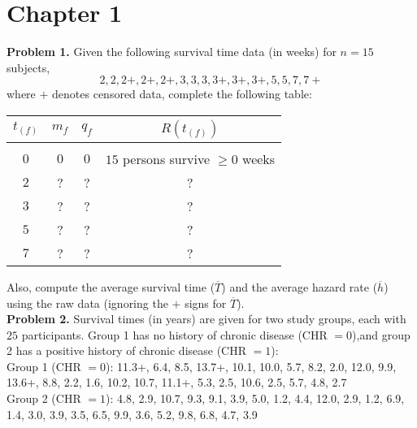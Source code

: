\documentclass[12pt]{article}
\begin{document}
\section{Chapter 1}



\textbf{Problem 1.}
Given the following survival time data (in weeks) for $n = 15$ subjects,
$$
2, 2, 2+, 2+, 2+, 3, 3, 3, 3+, 3+, 3+, 5, 5, 7, 7+
$$ where $+$ denotes censored data, complete the following table:

\begin{center}
\begin{tabular}{ c c c c }
 $t_{(f)}$ & $m_{f}$ & $q_{f}$ & $R(t_{(f)})$ \\
 \hline \\ 
 $0$ & $0$ & $0$ & $15$ persons survive $\geq 0$ weeks \\  
 $2$ &?  &?  &? \\
 $3$ &?  &?  &? \\    
 $5$ &?  &?  &? \\
 $7$ &?  &?  &?   
\end{tabular}
\end{center}

Also, compute the average survival time ($\overline{T}$) and the average hazard rate ($\overline{h}$) using the raw data (ignoring the $+$ signs for $\overline{T}$). \\



\textbf{Problem 2.}
Survival times (in years) are given for two study groups, each with $25$ participants. Group 1 has no history of chronic disease (CHR $= 0$),and group 2 has a positive history of chronic disease (CHR $= 1$): \\

Group 1 (CHR $= 0$): 11.3+, 6.4, 8.5, 13.7+, 10.1, 10.0, 5.7, 8.2, 2.0, 12.0, 9.9, 13.6+, 8.8, 2.2, 1.6, 10.2, 10.7, 11.1+, 5.3, 2.5, 10.6, 2.5, 5.7, 4.8, 2.7 \\

Group 2 (CHR $= 1$): 4.8, 2.9, 10.7, 9.3, 9.1, 3.9, 5.0, 1.2, 4.4, 12.0, 2.9, 1.2, 6.9, 1.4, 3.0, 3.9, 3.5, 6.5, 9.9, 3.6, 5.2, 9.8, 6.8, 4.7, 3.9 \\
\end{document}
